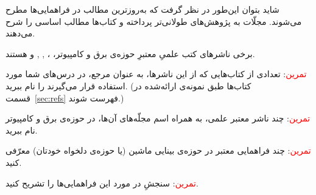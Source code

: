 \documentclass{article}
\begin{document}
\noindent شاید بتوان این‌طور در نظر گرفت که به‌روزترین مطالب در فراهمایی‌ها مطرح می‌شوند. مجلّات به پژوهش‌های طولانی‌تر پرداخته و کتاب‌ها مطالب اساسی را شرح می‌دهند.


\noindent برخی ناشر‌های کتب علمیِ معتبرِ حوزه‌ی برق و کامپیوتر، ، , ,  و  هستند.

\noindent \textcolor{red}{تمرین}: تعدادی از کتاب‌هایی که از این ناشرها، به عنوان مرجع، در درس‌های شما مورد استفاده قرار می‌گیرند را نام ببرید. (کتاب‌ها طبق نمونه‌ی ارائه‌شده در قسمت~\ref{sec:refs} فهرست شوند.)

\noindent \textcolor{red}{تمرین}: چند ناشر معتبر علمی، به همراه اسم مجلّه‌های آن‌ها، در حوزه‌ی برق و کامپیوتر نام ببرید.

\noindent \textcolor{red}{تمرین}: چند فراهمایی معتبر در حوزه‌ی بینایی ماشین (یا حوزه‌ی دلخواه خودتان) معرّفی کنید.

\noindent \textcolor{red}{تمرین}: سنجشِ  در مورد این فراهمایی‌ها را تشریح کنید.
\end{document}
